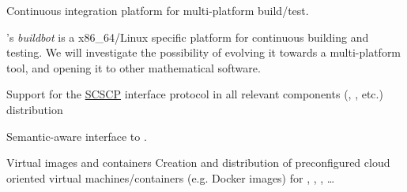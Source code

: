 \begin{workpackage}[id=component-architecture,wphases=0-48!.5,
  title=Component Architecture,lead=UV,
  PSRM=64,UVRM=8,SARM=16, USHRM=4, USORM=6, UBRM=12]
\begin{wpdelivs}
\begin{wpdeliv}[due=24,id=portability-cygwin64,dissem=PU,nature=OTHER,lead=PS]
    \end{wpdeliv}

    \begin{wpdeliv}[due=36,id=multiplatform-buildbot,dissem=PP,nature=DEM]
      {Continuous integration platform for multi-platform build/test.}

      \Sage's \emph{buildbot} is a x86\_64/Linux specific platform for
      continuous building and testing. We will investigate the
      possibility of evolving it towards a multi-platform tool, and
      opening it to other mathematical software.
    \end{wpdeliv}%
    \begin{wpdeliv}[due=12,id=scscp-sage,dissem=PU,nature=OTHER,lead=SA]
      {Support for the \href{http://www.symbolic-computing.org/}{SCSCP} interface protocol
        in all relevant components (\Sage, \GAP, etc.) distribution}
    \end{wpdeliv}

    \begin{wpdeliv}[due=36,id=semantic-interface-sage-gap,dissem=PU,nature=OTHER,lead=UO]
      {Semantic-aware \Sage interface to \GAP.}
    \end{wpdeliv}

    \begin{wpdeliv}[due=6,id=virtual-machines,dissem=PU,nature=OTHER]
      {Virtual images and containers} Creation and distribution of
      preconfigured cloud oriented virtual machines/containers
      (e.g. Docker images) for \PariGP, \Sage, \SMC, \dots
    \end{wpdeliv}


\end{wpdelivs}
\end{workpackage}
